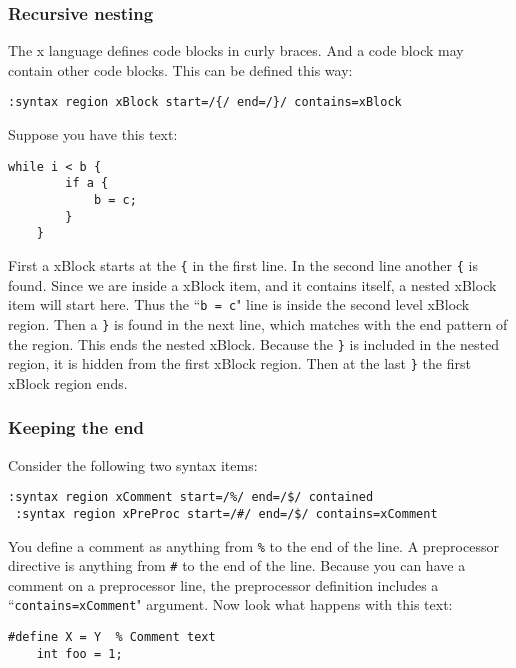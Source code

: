 \subsubsection{Recursive nesting}
The x language defines code blocks in curly braces.
And a code block may contain other code blocks.
This can be defined this way:

\begin{Verbatim}[samepage=true]
 :syntax region xBlock start=/{/ end=/}/ contains=xBlock
\end{Verbatim}

Suppose you have this text:

\begin{Verbatim}[samepage=true]
    while i < b {
        if a {
            b = c;
        }
    }
\end{Verbatim}

First a xBlock starts at the \texttt{\{} in the first line.
In the second line another \texttt{\{} is found.
Since we are inside a xBlock item, and it contains itself, a nested xBlock item will start here.
Thus the ``\texttt{b = c}" line is inside the second level xBlock region.
Then a \texttt{\}} is found in the next line, which matches with the end pattern of the region.
This ends the nested xBlock.
Because the \texttt{\}} is included in the nested region, it is hidden from the first xBlock region.
Then at the last \texttt{\}} the first xBlock region ends.

\subsubsection{Keeping the end}
Consider the following two syntax items:

\begin{Verbatim}[samepage=true]
 :syntax region xComment start=/%/ end=/$/ contained
 :syntax region xPreProc start=/#/ end=/$/ contains=xComment
\end{Verbatim}

You define a comment as anything from \texttt{\%} to the end of the line.
A preprocessor directive is anything from \texttt{\#} to the end of the line.
Because you can have a comment on a preprocessor line, the preprocessor definition includes a ``\texttt{contains=xComment}" argument.
Now look what happens with this text:

\begin{Verbatim}[samepage=true]
    #define X = Y  % Comment text
    int foo = 1;
\end{Verbatim}

